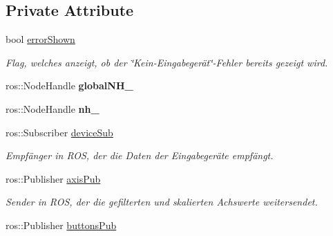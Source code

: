 \subsection*{Private Attribute}
\begin{DoxyCompactItemize}
\item 
\hypertarget{classControlDevice_af75949ecac8c9f77d8d972e17fab6fce}{bool \hyperlink{classControlDevice_af75949ecac8c9f77d8d972e17fab6fce}{error\-Shown}}\label{classControlDevice_af75949ecac8c9f77d8d972e17fab6fce}

\begin{DoxyCompactList}\small\item\em Flag, welches anzeigt, ob der \char`\"{}\-Kein-\/\-Eingabegerät\char`\"{}-\/\-Fehler bereits gezeigt wird. \end{DoxyCompactList}\item 
\hypertarget{classControlDevice_a757158b73df10bde260ff29734048465}{ros\-::\-Node\-Handle {\bfseries global\-N\-H\-\_\-}}\label{classControlDevice_a757158b73df10bde260ff29734048465}

\item 
\hypertarget{classControlDevice_ad19d5025e89e12b827b32a086e2b0763}{ros\-::\-Node\-Handle {\bfseries nh\-\_\-}}\label{classControlDevice_ad19d5025e89e12b827b32a086e2b0763}

\item 
\hypertarget{classControlDevice_ae8f236385e5bc7d4286d40cf6d6c5049}{ros\-::\-Subscriber \hyperlink{classControlDevice_ae8f236385e5bc7d4286d40cf6d6c5049}{device\-Sub}}\label{classControlDevice_ae8f236385e5bc7d4286d40cf6d6c5049}

\begin{DoxyCompactList}\small\item\em Empfänger in R\-O\-S, der die Daten der Eingabegeräte empfängt. \end{DoxyCompactList}\item 
\hypertarget{classControlDevice_ac7336bd3dae7b371b118d04086ab1b4b}{ros\-::\-Publisher \hyperlink{classControlDevice_ac7336bd3dae7b371b118d04086ab1b4b}{axis\-Pub}}\label{classControlDevice_ac7336bd3dae7b371b118d04086ab1b4b}

\begin{DoxyCompactList}\small\item\em Sender in R\-O\-S, der die gefilterten und skalierten Achswerte weitersendet. \end{DoxyCompactList}\item 
\hypertarget{classControlDevice_a9f35eb488a8e73d6a48a1d45f82c6979}{ros\-::\-Publisher \hyperlink{classControlDevice_a9f35eb488a8e73d6a48a1d45f82c6979}{buttons\-Pub}}\label{classControlDevice_a9f35eb488a8e73d6a48a1d45f82c6979}


\end{DoxyCompactItemize}
